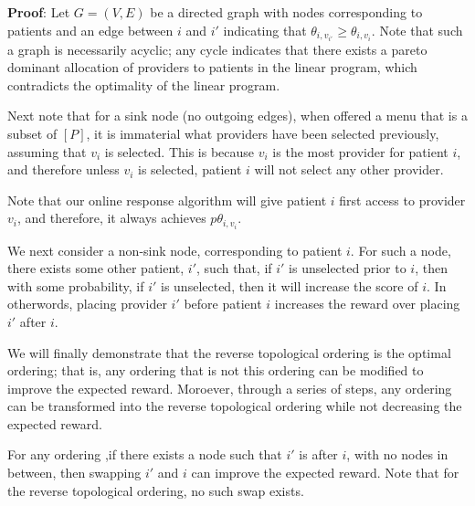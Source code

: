 \begin{prooof}
    \textbf{Proof}: Let $G=(V,E)$ be a directed graph with nodes corresponding to patients and an edge between $i$ and $i'$ indicating that $\theta_{i,v_{i'}} \geq \theta_{i,v_{i}}$. 
    Note that such a graph is necessarily acyclic; any cycle indicates that there exists a pareto dominant allocation of providers to patients in the linear program, which contradicts the optimality of the linear program. 

    Next note that for a sink node (no outgoing edges), when offered a menu that is a subset of $[P]$, it is immaterial what providers have been selected previously, assuming that $v_{i}$ is selected. 
    This is because $v_{i}$ is the most provider for patient $i$, and therefore unless $v_{i}$ is selected, patient $i$ will not select any other provider. 

    Note that our online response algorithm will give patient $i$ first access to provider $v_{i}$, and therefore, it always achieves $p \theta_{i,v_{i}}$. 

    We next consider a non-sink node, corresponding to patient $i$. 
    For such a node, there exists some other patient, $i'$, such that, if $i'$ is unselected prior to $i$, then with some probability, if $i'$ is unselected, then it will increase the score of $i$. 
    In otherwords, placing provider $i'$ before patient $i$ increases the reward over placing $i'$ after $i$. 

    We will finally demonstrate that the reverse topological ordering is the optimal ordering; that is, any ordering that is not this ordering can be modified to improve the expected reward. 
    Moroever, through a series of steps, any ordering can be transformed into the reverse topological ordering while not decreasing the expected reward. 

    For any ordering ,if there exists a node such that $i'$ is after $i$, with no nodes in between, then swapping $i'$ and $i$ can improve the expected reward. 
    Note that for the reverse topological ordering, no such swap exists. 


\end{prooof}
